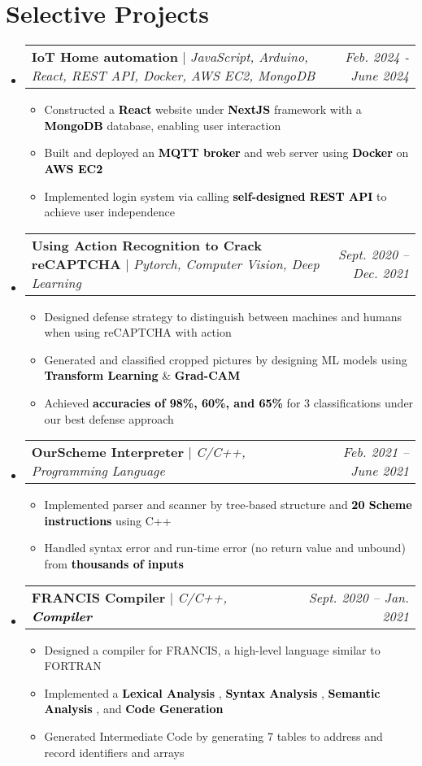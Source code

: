 \documentclass[letterpaper,11pt]{article}
\makeatletter
\newcommand{\HL}[1]{
  \textbf{\textcolor{black}{#1}}
}
\newcommand{\subheadingtitlevspace}{
\vspace{-3pt}
}
\newcommand{\resumeItem}[1]{
  \item{
    {#1}\vspace{-4pt}
  }
}
\newcommand{\titleItem}[1]{
  \textbf{#1}
}
\newcommand{\resumeProjectHeading}[2]{
    \item
    \begin{tabular*}{0.97\textwidth}{l@{\extracolsep{\fill}}r}
      #1 & \textit{ #2}
    \end{tabular*}\vspace{-8pt}
}
\newcommand{\resumeSubHeadingListStart}{\subheadingtitlevspace\begin{itemize}[leftmargin=0in, label={}]}
\newcommand{\resumeSubHeadingListEnd}{\end{itemize}}
\newcommand{\resumeItemListStart}{
\begin{itemize}[label={$\bullet$}, labelsep=8pt, itemsep=4pt]}
\newcommand{\resumeItemListEnd}{
\end{itemize}\vspace{-8pt}}
\makeatother
\begin{document}
 \section{Selective Projects}    
  \resumeSubHeadingListStart
    \resumeProjectHeading
      {\titleItem{IoT Home automation} $|$ \emph{JavaScript, Arduino, React, REST API, Docker, AWS EC2, MongoDB}}{Feb. 2024 - June 2024}
      \resumeItemListStart
        \resumeItem{Constructed a \HL{React} website under \HL{NextJS} framework with a \HL{MongoDB} database, enabling user interaction}
        \resumeItem{Built and deployed an \HL{MQTT broker} and web server using \HL{Docker} on \HL{AWS EC2}}
        \resumeItem{Implemented login system via calling \HL{self-designed REST API} to achieve user independence}
      \resumeItemListEnd
    \resumeProjectHeading
      {\titleItem{Using Action Recognition to Crack reCAPTCHA} $|$ \emph{ Pytorch, Computer Vision, Deep Learning}}{Sept. 2020 -- Dec. 2021}
      \resumeItemListStart
        \resumeItem{Designed defense strategy to distinguish between machines and humans when using reCAPTCHA with action}
        \resumeItem{Generated and classified cropped pictures by designing ML models using \HL{Transform Learning}\&\HL{Grad-CAM}}
        \resumeItem{Achieved \HL{accuracies of 98\%, 60\%, and 65\%} for 3 classifications under our best defense approach}
      \resumeItemListEnd
    \resumeProjectHeading
      {\titleItem{OurScheme Interpreter} $|$ \emph{C/C++, Programming Language}}{Feb. 2021 -- June 2021}
      \resumeItemListStart
        \resumeItem{Implemented parser and scanner by tree-based structure and \HL{20 Scheme instructions} using C++} 
        \resumeItem{Handled syntax error and run-time error (no return value and unbound) from \HL{thousands of inputs}}
      \resumeItemListEnd
    \resumeProjectHeading
      {\titleItem{FRANCIS Compiler} $|$ \emph{C/C++, \HL{Compiler}}}{Sept. 2020 -- Jan. 2021}
      \resumeItemListStart
        \resumeItem{Designed a compiler for FRANCIS, a high-level language similar to FORTRAN}
        \resumeItem{Implemented a \HL{Lexical Analysis}, \HL{Syntax Analysis}, \HL{Semantic Analysis}, and \HL{Code Generation}}
        \resumeItem{Generated Intermediate Code by generating 7 tables to address and record identifiers and arrays}
      \resumeItemListEnd
  \resumeSubHeadingListEnd
\end{document}
